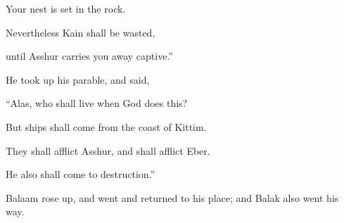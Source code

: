 {\par }{\QB Your nest is set in the rock.
\par }{\Q {}Nevertheless Kain shall be wasted,
\par }{\QB until Asshur carries you away captive.”
\par }{\PP {}He took up his parable, and said,
\par }{\Q “Alas, who shall live when God does this?
\par }{\QB {}But ships shall come from the coast of Kittim.
\par }{\Q They shall afflict Asshur, and shall afflict Eber.
\par }{\QB He also shall come to destruction.”
\par }{\PP {}Balaam rose up, and went and returned to his place; and Balak also went his way.

}
